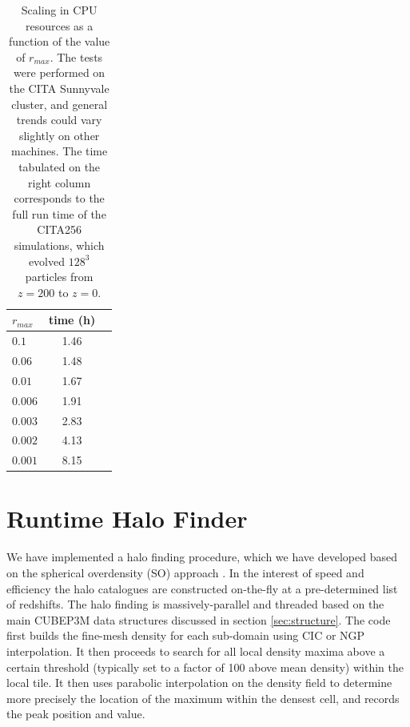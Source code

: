 \documentclass[useAMS,usenatbib]{mn2e}
\begin{document}
\begin{table}
\begin{center}
\caption{Scaling in {\small CPU} resources as a function of the value of $r_{max}$. The tests were performed 
on the CITA Sunnyvale cluster, and general trends could vary slightly on other machines. The time tabulated on the right column
corresponds to the full run time of the CITA256 simulations, which evolved $128^{3}$ particles from $z = 200$ to $z = 0$.}
\begin{tabular}{|l|c|c|}
\hline 
$r_{max}$         & time (h)   \\                 
\hline
 $0.1$ & 1.46 \\
 $0.06$ & 1.48\\
 $0.01$ & 1.67 \\
 $0.006$ & 1.91\\
 $0.003$ & 2.83 \\
 $0.002$ & 4.13\\
 $0.001$ & 8.15\\
\hline
\end{tabular}
\label{table:ra_max}
\end{center}
\end{table}



%

\section{Runtime Halo Finder}
\label{sec:halo}


We have implemented a halo finding procedure, which we have developed 
based on the spherical overdensity (SO) approach \citep{1994MNRAS.271..676L}.
In the interest of speed and efficiency the halo catalogues are constructed 
on-the-fly at a pre-determined list of redshifts. The halo finding is 
massively-parallel and threaded based on the main {\small CUBEP3M} data structures 
discussed in section \ref{sec:structure}. The code first builds the 
fine-mesh density for each sub-domain using CIC or NGP interpolation. It then 
proceeds to search for all local density maxima above a certain
threshold (typically set to a factor of 100 above mean density) within the local tile. 
It then uses parabolic interpolation on the density field to determine more precisely
the location of the maximum within the densest cell, and records the peak 
position and value. %
\end{document}
